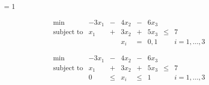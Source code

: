 \newcommand\lthtmlinlinemathZ{\egroup\expandafter\ifdim\dp\sizebox>0pt %
  \expandafter\centerinlinemath\fi\lthtmllogmath\lthtmlsetmath}
\def\lthtmlsetinline{\hbox{\vrule width.1em\vtop{\vbox{%
  \kern.1em\copy\sizebox}\ifdim\dp\sizebox>0pt\kern.1em\else\kern.3pt\fi
  \ifdim\hsize>\wd\sizebox \hrule depth1pt\fi}}}
\def\lthtmlsetmath{\hbox{\vrule width.1em\vtop{\vbox{%
  \kern.1em\kern0.8 pt\hbox{\hglue.17em\copy\sizebox\hglue0.8 pt}}\kern.3pt%
  \ifdim\dp\sizebox>0pt\kern.1em\fi \kern0.8 pt%
  \ifdim\hsize>\wd\sizebox \hrule depth1pt\fi}}}
\def\centerinlinemath{%
  \dimen1=\ifdim\ht\sizebox<\dp\sizebox \dp\sizebox\else\ht\sizebox\fi
  \advance\dimen1by.5pt \vrule width0pt height\dimen1 depth\dimen1 
 \dp\sizebox=\dimen1\ht\sizebox=\dimen1\relax}

\def\lthtmlcheckvsize{\ifdim\ht\sizebox<\vsize\expandafter\vfill
  \else\expandafter\vss\fi}%
\makeatletter \tracingstats = 1 



\pagestyle{empty}\thispagestyle{empty}%
%
%
%
%
%
%
%
%
%
%
\makeatletter
\if@twoside{}%
\else{}\fi%
\makeatother


{\newpage\clearpage
{}%
\begin{displaymath}
  \begin{array}{lrcrcrcl}
    \min & -3x_1 & - & 4x_2 & - & 6x_3 \\
   \mbox{subject to} & x_1 & + & 3x_2 & + & 5x_3 & \leq & 7 \\
         &&& x_i & = & 0,1 && i=1,...,3
  \end{array}
\end{displaymath}%
\lthtmldisplayZ
\hfill\lthtmlcheckvsize\clearpage}

{\newpage\clearpage
{}%
\begin{displaymath}
  \begin{array}{lrcrcrcl}
    \min & -3x_1 & - & 4x_2 & - & 6x_3 \\
   \mbox{subject to} & x_1 & + & 3x_2 & + & 5x_3 & \leq & 7 \\
         & 0 & \leq & x_i & \leq & 1 && i=1,...,3
  \end{array}
\end{displaymath}%
\lthtmldisplayZ
\hfill\lthtmlcheckvsize\clearpage}

